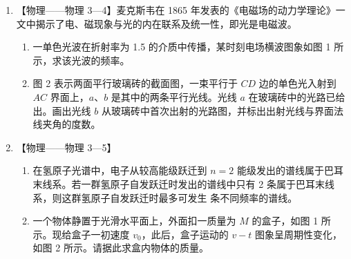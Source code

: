 \documentclass[\gkver]{gaokaozhenti}
\begin{document}
\begin{enumerate}
\item
【物理——物理 3—4】麦克斯韦在 1865 年发表的《电磁场的动力学理论》一文中揭示了电、磁现象与光的内在联系及统一性，即光是电磁波。

\begin{enumerate}
	\item
	一单色光波在折射率为 1.5 的介质中传播，某时刻电场横波图象如图 1 所示，求该光波的频率。
	\item
	图 2 表示两面平行玻璃砖的截面图，一束平行于 $CD$ 边的单色光入射到 $AC$ 界面上，$a$、$b$ 是其中的两条平行光线。光线 $a$ 在玻璃砖中的光路已给出。画出光线 $b$ 从玻璃砖中首次出射的光路图，并标出出射光线与界面法线夹角的度数。
\end{enumerate}





\item
【物理——物理 3—5】

\begin{enumerate}
	\item
	在氢原子光谱中，电子从较高能级跃迁到 $n=2$ 能级发出的谱线属于巴耳末线系。若一群氢原子自发跃迁时发出的谱线中只有 2 条属于巴耳末线系，则这群氢原子自发跃迁时最多可发生  条不同频率的谱线。
	\item
	一个物体静置于光滑水平面上，外面扣一质量为 $M$ 的盒子，如图 1 所示。现给盒子一初速度 $v_{0}$，此后，盒子运动的 $v-t$ 图象呈周期性变化，如图 2 所示。请据此求盒内物体的质量。
\end{enumerate}


\end{enumerate}
\end{document}
